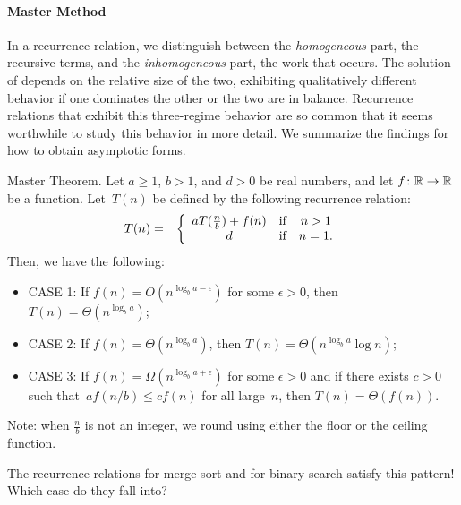 \paragraph{Master Method}
In a recurrence relation, we distinguish between
the \emph{homogeneous} part, the recursive terms,
and the \emph{inhomogeneous} part, the work that occurs.
The solution of depends on the relative size of the two,
exhibiting qualitatively different behavior if one dominates
the other or the two are in balance.
Recurrence relations that exhibit this three-regime behavior are so
common that it seems worthwhile to study this behavior in more detail.
We summarize the findings for how to obtain asymptotic forms.
\begin{theorem}{Master Theorem.}
    Let $a \geq 1$, $b > 1$, and $d > 0$ be real numbers,
    and let $f \colon {\mathbb R} \to {\mathbb R}$ be a function.
    Let~$T(n)$ be defined by the following recurrence relation:
    \begin{eqnarray*}
        T(n)  &=&  \left\{ \begin{array}{ccc}
            a T(\frac{n}{b}) + f(n)  &  \mbox{\rm if}  &   n > 1  \\
                    d                       &  \mbox{\rm if}  &   n = 1 .
        \end{array} \right.
    \end{eqnarray*}
    Then, we have the following:
    \begin{itemize}
        \item CASE 1: If $f(n)=O(n^{\log_b a - \epsilon})$ for some $\epsilon>0$,
            then $T(n) = \Theta (n^{\log_b a})$;
        \item CASE 2: If $f(n)=\Theta(n^{\log_b a})$, then $T(n) = \Theta (n^{\log_b a} \log n)$;
        \item CASE 3:  If $f(n)=\Omega(n^{\log_b a + \epsilon})$ for some $\epsilon>0$
            and if there exists $c>0$ such
            that~$af(n/b) \leq cf(n)$ for all large~$n$,
            then $T(n) = \Theta ( f(n) )$.
    \end{itemize}
\end{theorem}

Note: when $\frac{n}{b}$ is not an integer, we round using either the floor or
the ceiling function.

The recurrence relations for merge sort and for binary search satisfy this
pattern!  Which case do they fall into?
\practice
